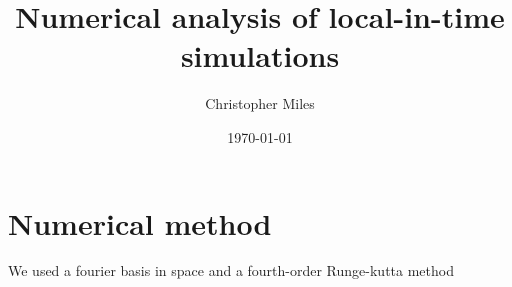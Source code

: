 \documentclass[12pt]{article}
\begin{document}
\title{ Numerical analysis of local-in-time simulations}
\author{Christopher Miles}
\date{\today}

\maketitle

\section{Numerical method}

We used a fourier basis in space and a fourth-order Runge-kutta method  



\end{document}
